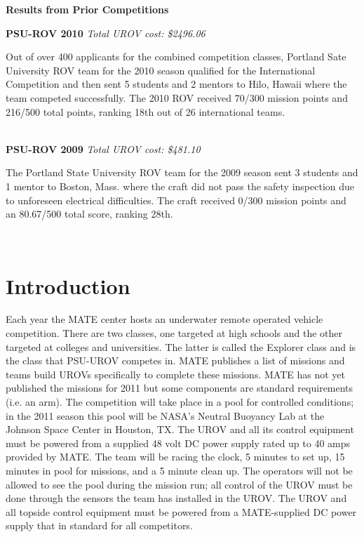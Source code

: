 \documentclass{proposalnsf}
\begin{document}
\centerline{\bf Results from Prior Competitions}

\noindent
{\bf PSU-ROV 2010}
{\it Total UROV cost: \$2496.06}

Out of over 400 applicants for the combined competition classes, Portland Sate University ROV team for the 2010 season qualified for the International Competition 
and then sent 5 students and 2 mentors to Hilo, Hawaii where the team competed successfully. The 2010 ROV received 70/300 mission points and 216/500 total points, 
ranking 18th out of 26 international teams.

\ \\
\noindent
{\bf PSU-ROV 2009}
{\it Total UROV cost: \$481.10}

The Portland State University ROV team for the 2009 season sent 3 students and 1 mentor to Boston, Mass. where the craft did not pass the safety inspection 
due to unforeseen electrical difficulties.  The craft received 0/300 mission points and an 80.67/500 total score, ranking 28th. 


\ \\

\section{Introduction}

Each year the MATE center hosts an underwater remote operated vehicle competition. There are two classes, one targeted at high schools and 
the other targeted at colleges and universities. The latter is called the Explorer class and is the class that PSU-UROV competes in. MATE 
publishes a list of missions and teams build UROVs specifically to complete these missions. MATE has not yet published the missions for 2011 
but some components are standard requirements (i.e. an arm). The competition will take place in a pool for controlled conditions; in the 2011 
season this pool will be NASA's Neutral Buoyancy Lab at the Johnson Space Center in Houston, TX. The UROV and all its control equipment 
must be powered from a supplied 48 volt DC power supply rated up to 40 amps provided by MATE. The team will be racing the clock, 
5 minutes to set up, 15 minutes in pool for missions, and a 5 minute clean up. The operators will not be allowed to see the pool during the mission run; all 
control of the UROV must be done through the sensors the team has installed in the UROV. The UROV and all topside control equipment must be 
powered from a MATE-supplied DC power supply that in standard for all competitors. 
\end{document}
